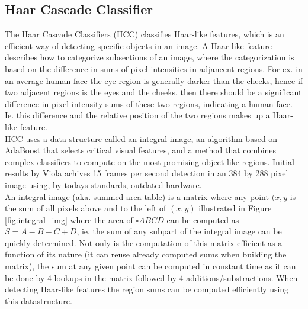 \subsection{Haar Cascade Classifier}\label{sec:hcc}
%
The Haar Cascade Classifiers (HCC)\cite{viola01,lienhart01,schmidt01,schmidt02} classifies Haar-like features, which is an efficient way of detecting specific objects in an image. A Haar-like feature describes how to categorize subsections of an image, where the categorization is based on the difference in sums of pixel intensities in adjancent regions. For ex. in an average human face the eye-region is generally darker than the cheeks, hence if two adjacent regions is the eyes and the cheeks. then there should be a significant difference in pixel intensity sums of these two regions, indicating a human face. Ie. this difference and the relative position of the two regions makes up a Haar-like feature.\\
HCC uses a data-structure called an integral image, an algorithm based on AdaBoost that selects critical visual features, and a method that combines complex classifiers to compute on the most promising object-like regions. Initial results by Viola\cite{viola01} achives 15 frames per second detection in an 384 by 288 pixel image using, by todays standards, outdated hardware.\\
%
An integral image (aka. summed area table) is a matrix where any point $(x,y$ is the sum of all pixels above and to the left of $(x,y)$ illustrated in Figure \ref{fig:integral_img} where the area of $\square ABCD$ can be computed as $S=A-B-C+D$, ie. the sum of any subpart of the integral image can be quickly determined. Not only is the computation of this matrix efficient as a function of its nature (it can reuse already computed sums when building the matrix), the sum at any given point can be computed in constant time as it can be done by 4 lookups in the matrix followed by 4 additions/substractions. When detecting Haar-like features the region sums can be computed efficiently using this datastructure.
